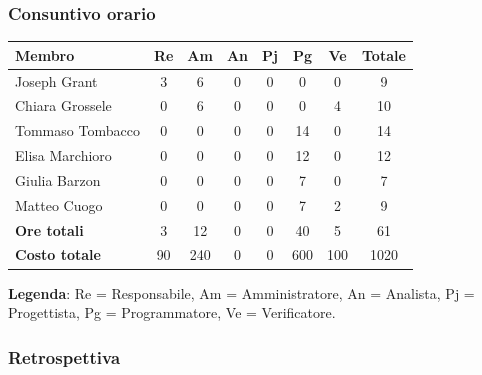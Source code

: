 \documentclass[11pt,a4paper]{article}
\begin{document}
\subsubsection{Consuntivo orario}
\begin{center}
    \begin{tabular}{|l|c|c|c|c|c|c|c|}
        \hline
        \textbf{Membro} & \textbf{Re} & \textbf{Am} & \textbf{An} & \textbf{Pj} & \textbf{Pg} & \textbf{Ve} & \textbf{Totale} \\
        \hline
        Joseph Grant & 3 & 6 & 0 & 0 & 0 & 0 & 9 \\
        \hline
        Chiara Grossele & 0 & 6 & 0 & 0 & 0 & 4 & 10 \\
        \hline
        Tommaso Tombacco & 0 & 0 & 0 & 0 & 14 & 0 & 14 \\
        \hline
        Elisa Marchioro & 0 & 0 & 0 & 0 & 12 & 0 & 12 \\
        \hline
        Giulia Barzon & 0 & 0 & 0 & 0 & 7 & 0 & 7 \\
        \hline
        Matteo Cuogo & 0 & 0 & 0 & 0 & 7 & 2 & 9 \\
        \hline
        \textbf{Ore totali} & 3 & 12 & 0 & 0 & 40 & 5 & 61 \\
        \hline
        \textbf{Costo totale} & 90 & 240 & 0 & 0 & 600 & 100 & 1020 \\
        \hline
    \end{tabular}
\end{center}

\noindent \textbf{Legenda}: Re = Responsabile, Am = Amministratore, An = Analista, Pj = Progettista, Pg = Programmatore, Ve = Verificatore.

\subsubsection{Retrospettiva}
\end{document}
